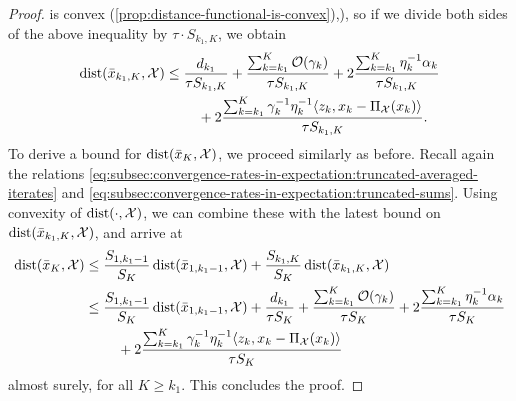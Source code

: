 \begin{proof}
    is convex (\cref{prop:distance-functional-is-convex}),), so if we divide both sides of
    the above inequality by $\tau \cdot S_{k_1, K}$, we obtain
    \begin{align*}
        \operatorname{dist}(\bar{x}_{k_1, K}, \mathcal{X})
        &\leq
        \frac{d_{k_1}}{\tau S_{k_1, K}} + \frac{\sum_{k=k_1}^{K} \mathcal{O}(\gamma_k)}{\tau S_{k_1, K}}
            + 2 \frac{\sum_{k=k_1}^{K}\eta_k^{-1}\alpha_k}{\tau S_{k_1, K}} \\
        &\phantom{===} + 2 \frac{\sum_{k=k_1}^K \gamma_k^{-1}\eta_k^{-1} \langle z_k, x_k - \operatorname{\Pi_\mathcal{X}}(x_k) \rangle}{\tau S_{k_1, K}}.
    \end{align*} 
    To derive a bound for $\operatorname{dist}(\bar{x}_K, \mathcal{X})$, we proceed similarly as before.
    Recall again the relations \eqref{eq:subsec:convergence-rates-in-expectation:truncated-averaged-iterates} and
    \eqref{eq:subsec:convergence-rates-in-expectation:truncated-sums}.
    Using convexity of $\operatorname{dist}(\cdot,\mathcal{X})$, we can combine these with the latest bound on $\operatorname{dist}(\bar{x}_{k_1, K}, \mathcal{X})$,
    and arrive at
    \begin{align*}
        \operatorname{dist}(\bar{x}_K, \mathcal{X})
        &\leq
        \frac{S_{1, k_1-1}}{S_K} \operatorname{dist}(\bar{x}_{1, k_1-1}, \mathcal{X})
            + \frac{S_{k_1, K}}{S_K} \operatorname{dist}(\bar{x}_{k_1, K}, \mathcal{X}) \\
        &\leq
        \frac{S_{1, k_1-1}}{S_K} \operatorname{dist}(\bar{x}_{1, k_1-1}, \mathcal{X})
            + \frac{d_{k_1}}{\tau S_K}
            + \frac{\sum_{k=k_1}^{K} \mathcal{O}(\gamma_k)}{\tau S_K}
            + 2 \frac{\sum_{k=k_1}^{K}\eta_k^{-1}\alpha_k}{\tau S_K} \\
        &\phantom{===} + 2 \frac{\sum_{k=k_1}^K \gamma_k^{-1}\eta_k^{-1} \langle z_k, x_k - \operatorname{\Pi_\mathcal{X}}(x_k) \rangle}{\tau S_K}
    \end{align*} 
    almost surely, for all $K \geq k_1$.
    This concludes the proof.
\end{proof}

